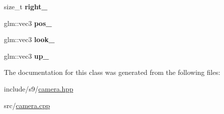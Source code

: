 \begin{DoxyCompactItemize}
\item 
\hypertarget{classs9_1_1Camera_ad56ce0d5e3a1bc7ccd0e993ef93ae171}{size\-\_\-t {\bfseries right\-\_\-}}\label{classs9_1_1Camera_ad56ce0d5e3a1bc7ccd0e993ef93ae171}

\item 
\hypertarget{classs9_1_1Camera_ad0e9f3951aea84ed9dcf22391d123f35}{glm\-::vec3 {\bfseries pos\-\_\-}}\label{classs9_1_1Camera_ad0e9f3951aea84ed9dcf22391d123f35}

\item 
\hypertarget{classs9_1_1Camera_ab7be66338e1ed45f7e7721089c7644ef}{glm\-::vec3 {\bfseries look\-\_\-}}\label{classs9_1_1Camera_ab7be66338e1ed45f7e7721089c7644ef}

\item 
\hypertarget{classs9_1_1Camera_a193b633a02c7c6dd1055d97d8f09baa4}{glm\-::vec3 {\bfseries up\-\_\-}}\label{classs9_1_1Camera_a193b633a02c7c6dd1055d97d8f09baa4}

\end{DoxyCompactItemize}


\-The documentation for this class was generated from the following files\-:\begin{DoxyCompactItemize}
\item 
include/s9/\hyperlink{camera_8hpp}{camera.\-hpp}\item 
src/\hyperlink{camera_8cpp}{camera.\-cpp}\end{DoxyCompactItemize}
